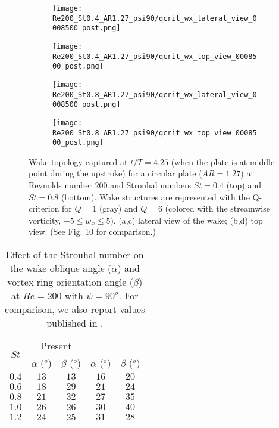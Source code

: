 \begin{figure}[!h]
  \centering
  \begin{subfigure}[]{0.45\textwidth}
    \centering
    \texttt{[image: Re200\_St0.4\_AR1.27\_psi90/qcrit\_wx\_lateral\_view\_0008500\_post.png]}
    \caption{}
    \label{fig:strouhal_wake_topology:0.4_lateral}
  \end{subfigure}
  \hfill
  \begin{subfigure}[]{0.45\textwidth}
    \centering
    \texttt{[image: Re200\_St0.4\_AR1.27\_psi90/qcrit\_wx\_top\_view\_0008500\_post.png]}
    \caption{}
    \label{fig:strouhal_wake_topology:0.4_top}
  \end{subfigure}
  \vspace{1cm}
  \begin{subfigure}[]{0.45\textwidth}
    \centering
    \texttt{[image: Re200\_St0.8\_AR1.27\_psi90/qcrit\_wx\_lateral\_view\_0008500\_post.png]}
    \caption{}
    \label{fig:strouhal_wake_topology:0.8_lateral}
  \end{subfigure}
  \hfill
  \begin{subfigure}[]{0.45\textwidth}
    \centering
    \texttt{[image: Re200\_St0.8\_AR1.27\_psi90/qcrit\_wx\_top\_view\_0008500\_post.png]}
    \caption{}
    \label{fig:strouhal_wake_topology:0.8_top}
  \end{subfigure}
  \caption{Wake topology captured at $t / T = 4.25$ (when the plate is at middle point during the upstroke) for a circular plate ($AR = 1.27$) at Reynolds number $200$ and Strouhal numbers $St = 0.4$ (top) and $St = 0.8$ (bottom). Wake structures are represented with the Q-criterion for $Q = 1$ (gray) and $Q = 6$ (colored with the streamwise vorticity, $-5 \leq w_x \leq 5$). (a,c) lateral view of the wake; (b,d) top view. (See Fig. 10 \citet{li_dong_2016} for comparison.)}
  \label{fig:strouhal_wake_topology}
\end{figure}

\begin{table}[!h]
  \centering
  \begin{tabular}{ccccc}
    \hline\hline
    \multirow{2}{*}{$St$} &
      \multicolumn{2}{c}{Present} &
      \multicolumn{2}{c}{\citet{li_dong_2016}} \\
    & $\alpha$ ($^o$) & $\beta$ ($^o$) & $\alpha$ ($^o$) & $\beta$ ($^o$) \\
    \hline
    $0.4$ & $13$ & $13$ & $16$ & $20$ \\
    $0.6$ & $18$ & $29$ & $21$ & $24$ \\
    $0.8$ & $21$ & $32$ & $27$ & $35$ \\
    $1.0$ & $26$ & $26$ & $30$ & $40$ \\
    $1.2$ & $24$ & $25$ & $31$ & $28$ \\
    \hline\hline
  \end{tabular}
  \caption{Effect of the Strouhal number on the wake oblique angle ($\alpha$) and vortex ring orientation angle ($\beta$) at $Re = 200$ with $\psi = 90^o$. For comparison, we also report values published in \citet{li_dong_2016}.}
  \label{tab:strouhal_angles}
\end{table}

